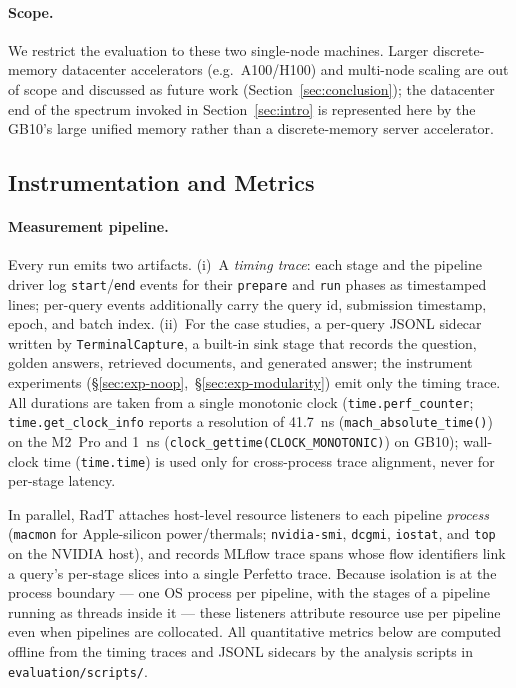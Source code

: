\paragraph{Scope.} We restrict the evaluation to these two single-node
machines. Larger discrete-memory datacenter accelerators (e.g.\ A100/H100) and
multi-node scaling are out of scope and discussed as future work
(Section~\ref{sec:conclusion}); the datacenter end of the spectrum invoked in
Section~\ref{sec:intro} is represented here by the GB10's large unified memory
rather than a discrete-memory server accelerator.

\subsection{Instrumentation and Metrics}
\label{sec:metrics}

\paragraph{Measurement pipeline.} Every run emits two artifacts. (i)~A
\emph{timing trace}: each stage and the pipeline driver log
\texttt{start}/\texttt{end} events for their \texttt{prepare} and \texttt{run}
phases as timestamped lines; per-query events additionally carry the query id,
submission timestamp, epoch, and batch index. (ii)~For the case studies, a
per-query JSONL sidecar written by \texttt{TerminalCapture}, a built-in sink
stage that records the question, golden answers, retrieved documents, and
generated answer; the instrument experiments
(\S\ref{sec:exp-noop},~\S\ref{sec:exp-modularity}) emit only the timing trace.
All durations are taken from a single monotonic clock (\texttt{time.perf\_counter};
\texttt{time.get\_clock\_info} reports a resolution of \SI{41.7}{\nano\second}
(\texttt{mach\_absolute\_time()}) on the
M2~Pro and \SI{1}{\nano\second} (\texttt{clock\_gettime(CLOCK\_MONOTONIC)}) on
GB10); wall-clock time (\texttt{time.time}) is
used only for cross-process trace alignment, never for per-stage latency.

In parallel, RadT attaches host-level resource listeners to each pipeline
\emph{process} (\texttt{macmon} for Apple-silicon power/thermals;
\texttt{nvidia-smi}, \texttt{dcgmi}, \texttt{iostat}, and \texttt{top} on the
NVIDIA host), and \sysname{} records MLflow trace spans whose flow identifiers
link a query's per-stage slices into a single Perfetto trace. Because isolation
is at the process boundary --- one OS process per pipeline, with the stages of
a pipeline running as threads inside it --- these listeners attribute resource
use per pipeline even when pipelines are collocated. All quantitative metrics
below are computed offline from the timing traces and JSONL sidecars by the
analysis scripts in \texttt{evaluation/scripts/}.

